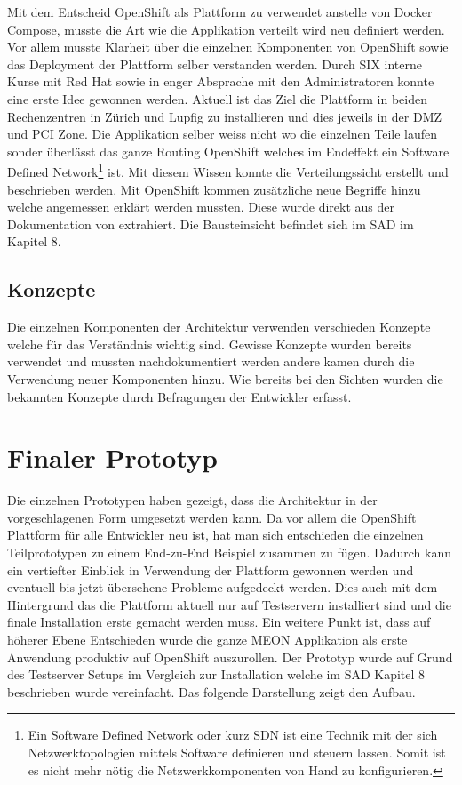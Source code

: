Mit dem Entscheid OpenShift als Plattform zu verwendet anstelle von Docker Compose, musste die Art wie die Applikation verteilt wird neu definiert werden. Vor allem musste Klarheit über die einzelnen Komponenten von OpenShift sowie das Deployment der Plattform selber verstanden werden. Durch SIX interne Kurse mit Red Hat sowie in enger Absprache mit den Administratoren konnte eine erste Idee gewonnen werden. Aktuell ist das Ziel die Plattform in beiden Rechenzentren in Zürich und Lupfig zu installieren und dies jeweils in der DMZ und PCI Zone. Die Applikation selber weiss nicht wo die einzelnen Teile laufen sonder überlässt das ganze Routing OpenShift welches im Endeffekt ein Software Defined Network\footnote{Ein Software Defined Network oder kurz SDN ist eine Technik mit der sich Netzwerktopologien mittels Software definieren und steuern lassen. Somit ist es nicht mehr nötig die Netzwerkkomponenten von Hand zu konfigurieren. } ist. Mit diesem Wissen konnte die Verteilungssicht erstellt und beschrieben werden. Mit OpenShift kommen zusätzliche neue Begriffe hinzu welche angemessen erklärt werden mussten. Diese wurde direkt aus der Dokumentation von \cite{osservicepod} extrahiert. Die Bausteinsicht befindet sich im SAD im Kapitel 8.

\subsection{Konzepte}

Die einzelnen Komponenten der Architektur verwenden verschieden Konzepte welche für das Verständnis wichtig sind. Gewisse Konzepte wurden bereits verwendet und mussten nachdokumentiert werden andere kamen durch die Verwendung neuer Komponenten hinzu. Wie bereits bei den Sichten wurden die bekannten Konzepte durch Befragungen der Entwickler erfasst.

\section{Finaler Prototyp}

Die einzelnen Prototypen haben gezeigt, dass die Architektur in der vorgeschlagenen Form umgesetzt werden kann. Da vor allem die OpenShift Plattform für alle Entwickler neu ist, hat man sich entschieden die einzelnen Teilprototypen zu einem End-zu-End Beispiel zusammen zu fügen. Dadurch kann ein vertiefter Einblick in Verwendung der Plattform gewonnen werden und eventuell bis jetzt übersehene Probleme aufgedeckt werden. Dies auch mit dem Hintergrund das die Plattform aktuell nur auf Testservern installiert sind und die finale Installation erste gemacht werden muss. Ein weitere Punkt ist, dass auf höherer Ebene Entschieden wurde die ganze MEON Applikation als erste Anwendung produktiv auf OpenShift auszurollen.\newline\newline
Der Prototyp wurde auf Grund des Testserver Setups im Vergleich zur Installation welche im SAD Kapitel 8 beschrieben wurde vereinfacht. Das folgende Darstellung zeigt den Aufbau.

